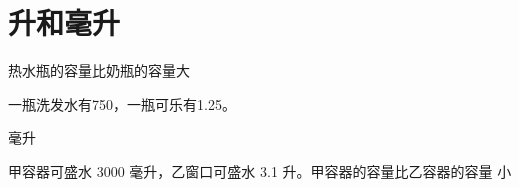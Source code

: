 
\section{升和毫升}


\xiaoti 热水瓶的容量比奶瓶的容量大 \hfill \parentheses


\xiaoti 一瓶洗发水有750\parentheses，一瓶可乐有1.25\parentheses。

  {毫升}

\xiaoti 甲容器可盛水 3000 毫升，乙窗口可盛水 3.1 升。甲容器的容量比乙容器的容量\parentheses
  {小}
